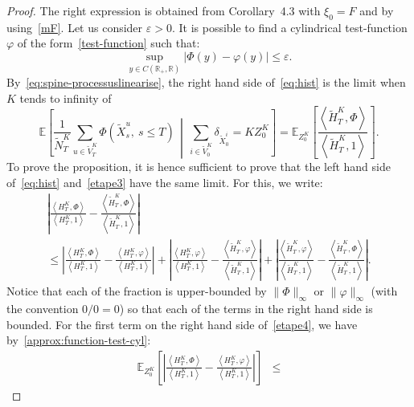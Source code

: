 \documentclass[AHL,Unicode,longabstracts,published]{cedram}
\newcommand*\R{\mathbb{R}}
\newcommand*\E{\mathbb{E}}
\begin{document}
\begin{proof}
The right expression is obtained from Corollary~4.3 with $\xi_{0}=F$ and by using~\eqref{mF}. Let us consider $\varepsilon>0$. It is possible to find a cylindrical test-function $\varphi$ of the form~\eqref{test-function} such that:
\begin{equation}\label{approx:function-test-cyl}
\sup_{y \in C(\R_+, \R)} \big|\Phi(y)-\varphi(y)\big|\leq \varepsilon.
\end{equation}
By~\eqref{eq:spine-processuslinearise}, the right hand side of~\eqref{eq:hist} is the limit when $K$ tends to infinity of
\begin{equation}\label{etape3}
\E\left[\frac{1}{\widetilde{N}^K_{T}}\sum_{u \in  \widetilde{V}^K_{T}}\Phi\left(\widetilde X^u_{s},\ s\leq T\right) \, \middle|\, \sum_{i \in \widetilde V^K_{0}} \delta_{\widetilde{X}^i_{0}}= K Z^K_0 \right] =\E_{Z^K_0}\left[\frac{\left\langle \widetilde{H}^K_T,\Phi\right\rangle}{\left\langle \widetilde{H}^K_T,1\right\rangle} \right].
\end{equation}
To prove the proposition, it is hence sufficient to prove that the left hand side of~\eqref{eq:hist} and~\eqref{etape3} have the same limit. For this, we write:
\begin{multline}\label{etape4}
\left| \frac{\left\langle H^K_T,\Phi\right\rangle}{\left\langle H^K_T,1\right\rangle} - \frac{\left\langle \widetilde{H}^K_T,\Phi\right\rangle}{\left\langle \widetilde{H}^K_T,1\right\rangle}\right|\\
\leq \left| \frac{\left\langle H^K_T,\Phi\right\rangle}{\left\langle H^K_T,1\right\rangle} - \frac{\left\langle H^K_T,\varphi\right\rangle}{\left\langle H^K_T,1\right\rangle}\right| + \left|\frac{\left\langle H^K_T,\varphi\right\rangle}{\left\langle H^K_T,1\right\rangle}-\frac{\left\langle \widetilde{H}^K_T,\varphi\right\rangle}{\left\langle \widetilde{H}^K_T,1\right\rangle}\right|
+\left|\frac{\left\langle \widetilde{H}^K_T,\varphi\right\rangle}{\left\langle \widetilde{H}^K_T,1\right\rangle}-\frac{\left\langle \widetilde{H}^K_T,\Phi\right\rangle}{\left\langle \widetilde{H}^K_T,1\right\rangle}\right|.
\end{multline}
Notice that each of the fraction is upper-bounded by $\|\Phi\|_\infty$ or $\|\varphi\|_\infty$ (with the convention $0/0=0$) so that each of the terms in the right hand side is bounded. For the first term on the right hand side of~\eqref{etape4}, we have by~\eqref{approx:function-test-cyl}:
\begin{align*}
\E_{Z^K_0}\left[\left| \frac{\left\langle H^K_T,\Phi\right\rangle}{\left\langle H^K_T,1\right\rangle} - \frac{\left\langle H^K_T,\varphi\right\rangle}{\left\langle H^K_T,1\right\rangle}\right|\right]&\leq

\end{align*}
\end{proof}
\end{document}
